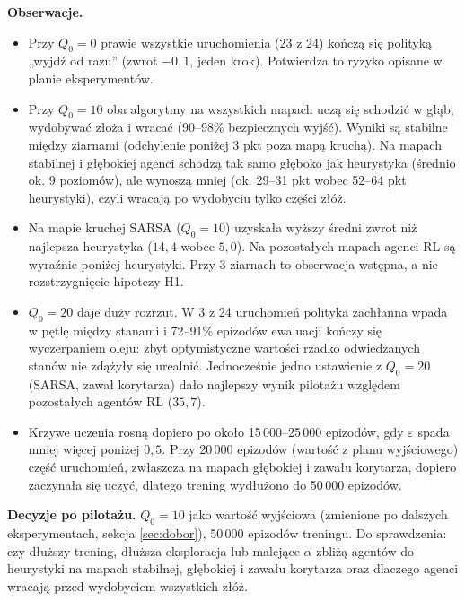 \documentclass[11pt,a4paper]{article}
\begin{document}
\textbf{Obserwacje.}
\begin{itemize}
  \item Przy $Q_0=0$ prawie wszystkie uruchomienia (23 z 24) kończą się polityką
  „wyjdź od razu” (zwrot $-0{,}1$, jeden krok). Potwierdza to ryzyko opisane
  w planie eksperymentów.
  \item Przy $Q_0=10$ oba algorytmy na wszystkich mapach uczą się schodzić
  w głąb, wydobywać złoża i wracać (90--98\% bezpiecznych wyjść). Wyniki są
  stabilne między ziarnami (odchylenie poniżej 3 pkt poza mapą kruchą).
  Na mapach stabilnej i głębokiej agenci schodzą tak samo głęboko jak heurystyka
  (średnio ok. 9 poziomów), ale wynoszą mniej (ok. 29--31 pkt wobec 52--64 pkt
  heurystyki), czyli wracają po wydobyciu tylko części złóż.
  \item Na mapie kruchej SARSA ($Q_0=10$) uzyskała wyższy średni zwrot niż
  najlepsza heurystyka ($14{,}4$ wobec $5{,}0$). Na pozostałych mapach agenci
  RL są wyraźnie poniżej heurystyki. Przy 3 ziarnach to obserwacja wstępna,
  a nie rozstrzygnięcie hipotezy H1.
  \item $Q_0=20$ daje duży rozrzut. W 3 z 24 uruchomień polityka zachłanna
  wpada w pętlę między stanami i 72--91\% epizodów ewaluacji kończy się
  wyczerpaniem oleju: zbyt optymistyczne wartości rzadko odwiedzanych stanów nie
  zdążyły się urealnić. Jednocześnie jedno ustawienie z $Q_0=20$ (SARSA, zawał
  korytarza) dało najlepszy wynik pilotażu względem pozostałych agentów RL
  ($35{,}7$).
  \item Krzywe uczenia rosną dopiero po około 15\,000--25\,000 epizodów, gdy
  $\varepsilon$ spada mniej więcej poniżej $0{,}5$. Przy 20\,000 epizodów
  (wartość z planu wyjściowego) część uruchomień, zwłaszcza na mapach głębokiej
  i zawału korytarza, dopiero zaczynała się uczyć, dlatego trening wydłużono
  do 50\,000 epizodów.
\end{itemize}

\textbf{Decyzje po pilotażu.} $Q_0=10$ jako wartość wyjściowa (zmienione po
dalszych eksperymentach, sekcja \ref{sec:dobor}), 50\,000 epizodów treningu. Do sprawdzenia: czy dłuższy trening, dłuższa
eksploracja lub malejące $\alpha$ zbliżą agentów do heurystyki na mapach
stabilnej, głębokiej i zawału korytarza oraz dlaczego agenci wracają przed
wydobyciem wszystkich złóż.
\end{document}
